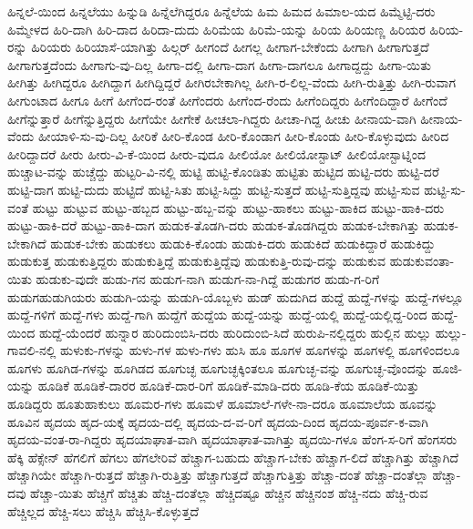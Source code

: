 {ಹಿನ್ನಲೆ-ಯಿಂದ
ಹಿನ್ನಲೆಯು
ಹಿನ್ನುಡಿ
ಹಿನ್ನೆಲೆಗಿದ್ದರೂ
ಹಿನ್ನೆಲೆಯ
ಹಿಮ
ಹಿಮದ
ಹಿಮಾಲ-ಯದ
ಹಿಮ್ಮೆಟ್ಟಿ-ದರು
ಹಿಮ್ಮೇಳದ
ಹಿರಿ-ದಾಗಿ
ಹಿರಿ-ದಾದ
ಹಿರಿದಾ-ದುದು
ಹಿರಿಮೆಯ
ಹಿರಿಮೆ-ಯನ್ನು
ಹಿರಿಯ
ಹಿರಿಯಣ್ಣ
ಹಿರಿಯರ
ಹಿರಿಯ-ರನ್ನು
ಹಿರಿಯರು
ಹಿರಿಯಾಸೆ-ಯಾಗಿತ್ತು
ಹಿಲ್ಗರ್
ಹೀಗಂದೆ
ಹೀಗಲ್ಲ
ಹೀಗಾಗ-ಬೇಕೆಂದು
ಹೀಗಾಗಿ
ಹೀಗಾಗುತ್ತದೆ
ಹೀಗಾಗುತ್ತದೆಂದು
ಹೀಗಾಗು-ವು-ದಿಲ್ಲ
ಹೀಗಾ-ದಲ್ಲಿ
ಹೀಗಾ-ದಾಗ
ಹೀಗಾ-ದಾಗಲೂ
ಹೀಗಾದ್ದದ್ದು
ಹೀಗಾ-ಯಿತು
ಹೀಗಿತ್ತು
ಹೀಗಿದ್ದರೂ
ಹೀಗಿದ್ದಾಗ
ಹೀಗಿದ್ದಿದ್ದರೆ
ಹೀಗಿರಬೇಕಾಗಿಲ್ಲ
ಹೀಗಿ-ರ-ಲಿಲ್ಲ-ವೆಂದು
ಹೀಗಿ-ರುತ್ತಿತ್ತು
ಹೀಗಿ-ರುವಾಗ
ಹೀಗುಂಟಾದ
ಹೀಗೂ
ಹೀಗೆ
ಹೀಗೆಂದ-ರಂತೆ
ಹೀಗೆಂದರು
ಹೀಗೆಂದ-ರೆಂದು
ಹೀಗೆಂದಿದ್ದರು
ಹೀಗೆಂದಿದ್ದಾರೆ
ಹೀಗೆಂದೆ
ಹೀಗೆನ್ನುತ್ತಾರೆ
ಹೀಗೆನ್ನುತ್ತಿದ್ದರು
ಹೀಗೆಯೇ
ಹೀಗೇಕೆ
ಹೀಚಲಾ-ಗಿದ್ದರು
ಹೀಚಾ-ಗಿದ್ದ
ಹೀಚು
ಹೀನಾಯ-ವಾಗಿ
ಹೀನಾಯ-ವೆಂದು
ಹೀಯಾಳಿ-ಸು-ವು-ದಿಲ್ಲ
ಹೀರಿಕೆ
ಹೀರಿ-ಕೊಂಡ
ಹೀರಿ-ಕೊಂಡಾಗ
ಹೀರಿ-ಕೊಂಡು
ಹೀರಿ-ಕೊಳ್ಳುವುದು
ಹೀರಿದ
ಹೀರಿದ್ದಾದರೆ
ಹೀರು
ಹೀರು-ವಿ-ಕೆ-ಯಿಂದ
ಹೀರು-ವುದೂ
ಹೀಲಿಯೋ
ಹೀಲಿಯೋಸ್ಟಾಟ್
ಹೀಲಿಯೋಸ್ಟಾಟ್ನಿಂದ
ಹುಚ್ಚಾಟ-ವನ್ನು
ಹುಚ್ಚೆದ್ದು
ಹುಟ್ಟರಿ-ವಿ-ನಲ್ಲಿ
ಹುಟ್ಟಿ
ಹುಟ್ಟಿ-ಕೊಂಡಿತು
ಹುಟ್ಟಿತು
ಹುಟ್ಟಿದ
ಹುಟ್ಟಿ-ದರು
ಹುಟ್ಟಿ-ದರೆ
ಹುಟ್ಟಿ-ದಾಗ
ಹುಟ್ಟಿ-ದುದು
ಹುಟ್ಟಿದೆ
ಹುಟ್ಟಿ-ಸಿತು
ಹುಟ್ಟಿ-ಸಿದ್ದು
ಹುಟ್ಟಿ-ಸುತ್ತದೆ
ಹುಟ್ಟಿ-ಸುತ್ತಿದ್ದವು
ಹುಟ್ಟಿ-ಸುವ
ಹುಟ್ಟಿ-ಸು-ವಂತೆ
ಹುಟ್ಟು
ಹುಟ್ಟುವ
ಹುಟ್ಟು-ಹಬ್ಬದ
ಹುಟ್ಟು-ಹಬ್ಬ-ವನ್ನು
ಹುಟ್ಟು-ಹಾಕಲು
ಹುಟ್ಟು-ಹಾಕಿದ
ಹುಟ್ಟು-ಹಾಕಿ-ದರು
ಹುಟ್ಟು-ಹಾಕಿ-ದರೆ
ಹುಟ್ಟು-ಹಾಕಿ-ದಾಗ
ಹುಡುಕ-ತೊಡಗಿ-ದರು
ಹುಡುಕ-ತೊಡಗಿದ್ದರು
ಹುಡುಕ-ಬೇಕಾಗಿತ್ತು
ಹುಡುಕ-ಬೇಕಾಗಿದೆ
ಹುಡುಕ-ಬೇಕು
ಹುಡುಕಲು
ಹುಡುಕಿ-ಕೊಂಡು
ಹುಡುಕಿ-ದರು
ಹುಡುಕಿದೆ
ಹುಡುಕಿದ್ದಾರೆ
ಹುಡುಕಿದ್ದು
ಹುಡುಕುತ್ತ
ಹುಡುಕುತ್ತಿದ್ದರು
ಹುಡುಕುತ್ತಿದ್ದೆ
ಹುಡುಕುತ್ತಿದ್ದೆವು
ಹುಡುಕುತ್ತಿ-ರುವು-ದನ್ನು
ಹುಡುಕುವ
ಹುಡುಕುವಂತಾ-ಯಿತು
ಹುಡುಕು-ವುದೇ
ಹುಡು-ಗನ
ಹುಡುಗ-ನಾಗಿ
ಹುಡುಗ-ನಾ-ಗಿದ್ದೆ
ಹುಡುಗರ
ಹುಡು-ಗ-ರಿಗೆ
ಹುಡುಗಹುಡುಗಿಯರು
ಹುಡುಗಿ-ಯನ್ನು
ಹುಡುಗಿ-ಯೊಬ್ಬಳು
ಹುಡ್
ಹುದುಗಿದ
ಹುದ್ದೆ
ಹುದ್ದೆ-ಗಳನ್ನು
ಹುದ್ದೆ-ಗಳಲ್ಲೂ
ಹುದ್ದೆ-ಗಳಿಗೆ
ಹುದ್ದೆ-ಗಳು
ಹುದ್ದೆ-ಗಾಗಿ
ಹುದ್ದೆಗೆ
ಹುದ್ದೆಯ
ಹುದ್ದೆ-ಯನ್ನು
ಹುದ್ದೆ-ಯಲ್ಲಿ
ಹುದ್ದೆ-ಯಲ್ಲಿದ್ದ-ರಿಂದ
ಹುದ್ದೆ-ಯಿಂದ
ಹುದ್ದೆ-ಯೆಂದರೆ
ಹುನ್ನಾರ
ಹುರಿದುಂಬಿಸಿ-ದರು
ಹುರಿದುಂಬಿ-ಸಿದೆ
ಹುರುಪಿ-ನಲ್ಲಿದ್ದರು
ಹುಲ್ಲಿನ
ಹುಲ್ಲು
ಹುಲ್ಲು-ಗಾವಲಿ-ನಲ್ಲಿ
ಹುಳುಕು-ಗಳನ್ನು
ಹುಳು-ಗಳ
ಹುಳು-ಗಳು
ಹುಸಿ
ಹೂ
ಹೂಗಳ
ಹೂಗಳನ್ನು
ಹೂಗಳಲ್ಲಿ
ಹೂಗಳಿಂದಲೂ
ಹೂಗಳು
ಹೂಗಿಡ-ಗಳನ್ನು
ಹೂಗಿಡದ
ಹೂಗುಚ್ಛ
ಹೂಗುಚ್ಛಕ್ಕಿಂತಲೂ
ಹೂಗುಚ್ಛ-ವನ್ನು
ಹೂಗುಚ್ಛ-ವೊಂದನ್ನು
ಹೂಜಿ-ಯನ್ನು
ಹೂಡಿಕೆ
ಹೂಡಿಕೆ-ದಾರರ
ಹೂಡಿಕೆ-ದಾರ-ರಿಗೆ
ಹೂಡಿಕೆ-ಮಾಡಿ-ದರು
ಹೂಡಿ-ಕೆಯ
ಹೂಡಿಕೆ-ಯಿತ್ತು
ಹೂಡಿದ್ದರು
ಹೂತುಹಾಕುಲು
ಹೂಮರ-ಗಳು
ಹೂಮಳೆ
ಹೂಮಾಲೆ-ಗಳೇ-ನಾ-ದರೂ
ಹೂಮಾಲೆಯ
ಹೂವನ್ನು
ಹೂವಿನ
ಹೃದಯ
ಹೃದ-ಯಕ್ಕೆ
ಹೃದಯ-ದಲ್ಲಿ
ಹೃದಯ-ದ-ವ-ರಿಗೆ
ಹೃದಯ-ದಿಂದ
ಹೃದಯ-ಪೂರ್ವ-ಕ-ವಾಗಿ
ಹೃದಯ-ವಂತ-ರಾ-ಗಿದ್ದರು
ಹೃದಯಾಘಾತ-ವಾಗಿ
ಹೃದಯಾಘಾತ-ವಾಗಿತ್ತು
ಹೃದಯಿ-ಗಳೂ
ಹೆಂಗ-ಸ-ರಿಗೆ
ಹೆಂಗಸರು
ಹೆಕ್ಕಿ
ಹೆಕ್ಸೇನ್
ಹೆಗಲಿಗೆ
ಹೆಗಲು
ಹೆಗಲೇರಿವೆ
ಹೆಚ್ಚಾಗ-ಬಹುದು
ಹೆಚ್ಚಾಗ-ಬೇಕು
ಹೆಚ್ಚಾಗ-ಲಿದೆ
ಹೆಚ್ಚಾಗಿತ್ತು
ಹೆಚ್ಚಾಗಿದೆ
ಹೆಚ್ಚಾಗಿಯೇ
ಹೆಚ್ಚಾಗಿ-ರುತ್ತದೆ
ಹೆಚ್ಚಾಗಿ-ರುತ್ತಿತ್ತು
ಹೆಚ್ಚಾಗುತ್ತದೆ
ಹೆಚ್ಚಾಗುತ್ತಿತ್ತು
ಹೆಚ್ಚಾ-ದಂತೆ
ಹೆಚ್ಚಾ-ದಂತೆಲ್ಲಾ
ಹೆಚ್ಚಾ-ದವು
ಹೆಚ್ಚಾ-ಯಿತು
ಹೆಚ್ಚಿಗೆ
ಹೆಚ್ಚಿತು
ಹೆಚ್ಚಿ-ದಂತೆಲ್ಲಾ
ಹೆಚ್ಚಿದಷ್ಟೂ
ಹೆಚ್ಚಿನ
ಹೆಚ್ಚಿನಂಶ
ಹೆಚ್ಚಿ-ನದು
ಹೆಚ್ಚಿ-ರುವ
ಹೆಚ್ಚಿಲ್ಲದ
ಹೆಚ್ಚಿ-ಸಲು
ಹೆಚ್ಚಿಸಿ
ಹೆಚ್ಚಿಸಿ-ಕೊಳ್ಳುತ್ತದೆ
}

